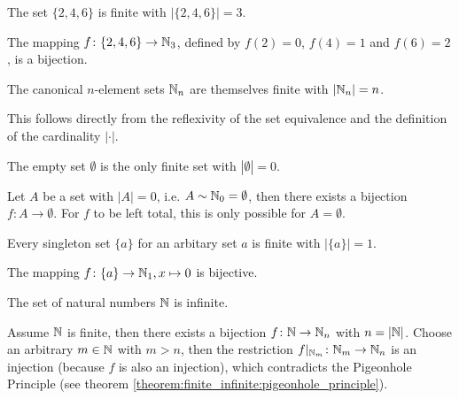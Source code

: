 \begin{examples}
    \begin{exampleenumerate}
        \item The set $\{2,4,6\}$ is finite with $|\{2,4,6\}|=3$.
        \begin{miniproof}
            The mapping $f\colon \{2,4,6\}\to\mathbb{N}_3$, defined by $f(2)=0$, $f(4)=1$ and $f(6)=2$, is a bijection.
        \end{miniproof}
        \item The canonical $n$-element sets $\mathbb{N}_n$ are themselves finite with $|\mathbb{N}_n|=n$.
        \begin{miniproof}
            This follows directly from the reflexivity of the set equivalence and the definition of the cardinality $|\cdot|$.
        \end{miniproof}
        \item\label{example:finite_infinite:empty_set} The empty set $\emptyset$ is the only finite set with $|\emptyset|=0$.
        \begin{miniproof}
            Let $A$ be a set with $|A|=0$, i.e. $A\sim\mathbb{N}_0=\emptyset$, then there exists a bijection $f\colon A\rightarrow\emptyset$. For $f$ to be left total, this is only possible for $A=\emptyset$.
        \end{miniproof}
        \item Every singleton set $\{a\}$ for an arbitary set $a$ is finite with $|\{a\}|=1$.
        \begin{miniproof}
            The mapping $f\colon \{a\}\to\mathbb{N}_1,x\mapsto 0$ is bijective.
        \end{miniproof}
        \item The set of natural numbers $\mathbb{N}$ is infinite.
        \begin{miniproof}
            Assume $\mathbb{N}$ is finite, then there exists a bijection $f\colon\mathbb{N}\to\mathbb{N}_n$ with $n=|\mathbb{N}|$. Choose an arbitrary $m\in\mathbb{N}$ with $m>n$, then the restriction $f\vert_{\mathbb{N}_m}\colon\mathbb{N}_m\to\mathbb{N}_n$ is an injection (because $f$ is also an injection), which contradicts the Pigeonhole Principle (see theorem \ref{theorem:finite_infinite:pigeonhole_principle}).
        \end{miniproof}
    \end{exampleenumerate}
\end{examples}

